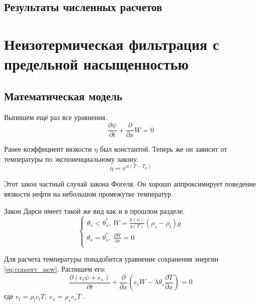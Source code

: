 \documentclass[12pt,a4paper]{article}
\newcommand{\pd}[2]{\frac{\partial #1}{\partial #2}}
\begin{document}
\subsection{Результаты численных расчетов}

\newpage
\section{Неизотермическая фильтрация с предельной насыщенностью}
\subsection{Математическая модель}

Выпишем ещё раз все уравнения.
$$
\pd{\psi}{t} + \pd{}{x}W = 0
$$

Ранее коэффициент вязкости $\eta$ был константой. Теперь же он зависит от температуры по экспоненциальному закону.
\begin{equation}
\eta = e^{\alpha(T - T_{0})}
\label{viscos}
\end{equation}

Этот закон частный случай закона Фогеля. Он хорошо аппроксимирует поведение вязкости нефти на небольшом промежутке температур.

Закон Дарси имеет такой же вид как и в прошлом разделе.
$$
\begin{cases}
\theta_s < \theta_s^*,\  W = \frac{k(\psi)}{\eta(T)} (\rho_s - \rho_l) g\\
\theta_s = \theta_s^*,\  \pd{W}{x} = 0\\
\end{cases}
$$

Для расчета температуры понадобится уравнение сохранения энергии \eqref{eq:conserv_new}. Распишем его:	
$$
\pd{(e_l\psi+e_s)}{t} + \pd{}{x}(e_l W - \lambda\theta_s\pd{T}{x}) = 0
$$
где $ e_l = \rho_l c_l T,\ e_s = \rho_s c_s T $ .
\end{document}
